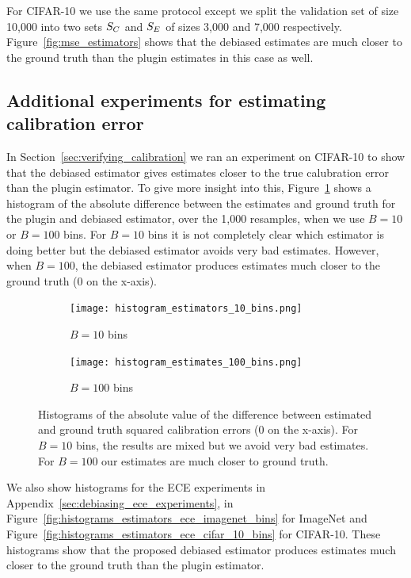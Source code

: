 For CIFAR-10 we use the same protocol except we split the validation set of size 10,000 into two sets $S_C{}$ and $S_E{}$ of sizes 3,000 and 7,000 respectively. Figure~\ref{fig:mse_estimators} shows that the debiased estimates are much closer to the ground truth than the plugin estimates in this case as well.


\subsection{Additional experiments for estimating calibration error}

In Section~\ref{sec:verifying_calibration} we ran an experiment on CIFAR-10 to show that the debiased estimator gives estimates closer to the true calubration error than the plugin estimator. To give more insight into this, Figure~\ref{fig:histograms_estimators_bins} shows a histogram of the absolute difference between the estimates and ground truth for the plugin and debiased estimator, over the 1,000 resamples, when we use $B = 10$ or $B = 100$ bins. For $B = 10$ bins it is not completely clear which estimator is doing better but the debiased estimator avoids very bad estimates. However, when $B = 100$, the debiased estimator produces estimates much closer to the ground truth ($0$ on the x-axis).

\begin{figure}
  \centering
  \centering
     \begin{subfigure}[b]{0.45\textwidth}
         \centering
         \texttt{[image: histogram\_estimators\_10\_bins.png]}
         \caption{$B = 10$ bins}
     \end{subfigure}
     \hfill
     \begin{subfigure}[b]{0.45\textwidth}
         \centering
         \texttt{[image: histogram\_estimates\_100\_bins.png]}
         \caption{$B = 100$ bins}
     \end{subfigure}
  \caption{Histograms of the absolute value of the difference between estimated and ground truth squared calibration errors ($0$ on the x-axis). For $B = 10$ bins, the results are mixed but we avoid very bad estimates. For $B=100$ our estimates are much closer to ground truth.}
  \label{fig:histograms_estimators_bins}
\end{figure}

We also show histograms for the ECE experiments in Appendix~\ref{sec:debiasing_ece_experiments}, in Figure~\ref{fig:histograms_estimators_ece_imagenet_bins} for ImageNet and Figure~\ref{fig:histograms_estimators_ece_cifar_10_bins} for CIFAR-10. These histograms show that the proposed debiased estimator produces estimates much closer to the ground truth than the plugin estimator.

